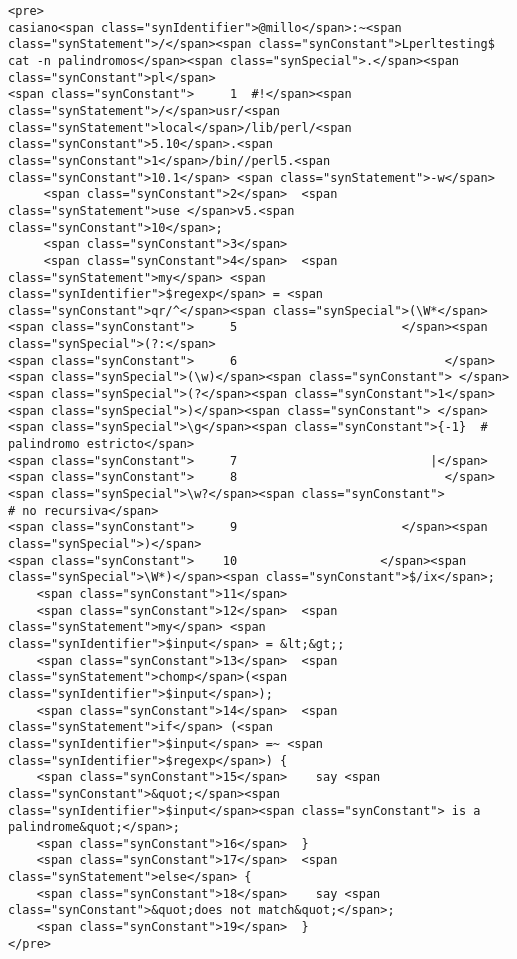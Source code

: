 \begin{verbatim}
<pre>
casiano<span class="synIdentifier">@millo</span>:~<span class="synStatement">/</span><span class="synConstant">Lperltesting$ cat -n palindromos</span><span class="synSpecial">.</span><span class="synConstant">pl</span>
<span class="synConstant">     1  #!</span><span class="synStatement">/</span>usr/<span class="synStatement">local</span>/lib/perl/<span class="synConstant">5.10</span>.<span class="synConstant">1</span>/bin//perl5.<span class="synConstant">10.1</span> <span class="synStatement">-w</span>
     <span class="synConstant">2</span>  <span class="synStatement">use </span>v5.<span class="synConstant">10</span>;
     <span class="synConstant">3</span>
     <span class="synConstant">4</span>  <span class="synStatement">my</span> <span class="synIdentifier">$regexp</span> = <span class="synConstant">qr/^</span><span class="synSpecial">(\W*</span>
<span class="synConstant">     5                       </span><span class="synSpecial">(?:</span>
<span class="synConstant">     6                             </span><span class="synSpecial">(\w)</span><span class="synConstant"> </span><span class="synSpecial">(?</span><span class="synConstant">1</span><span class="synSpecial">)</span><span class="synConstant"> </span><span class="synSpecial">\g</span><span class="synConstant">{-1}  # palindromo estricto</span>
<span class="synConstant">     7                           |</span>
<span class="synConstant">     8                             </span><span class="synSpecial">\w?</span><span class="synConstant">               # no recursiva</span>
<span class="synConstant">     9                       </span><span class="synSpecial">)</span>
<span class="synConstant">    10                    </span><span class="synSpecial">\W*)</span><span class="synConstant">$/ix</span>;
    <span class="synConstant">11</span>
    <span class="synConstant">12</span>  <span class="synStatement">my</span> <span class="synIdentifier">$input</span> = &lt;&gt;;
    <span class="synConstant">13</span>  <span class="synStatement">chomp</span>(<span class="synIdentifier">$input</span>);
    <span class="synConstant">14</span>  <span class="synStatement">if</span> (<span class="synIdentifier">$input</span> =~ <span class="synIdentifier">$regexp</span>) {
    <span class="synConstant">15</span>    say <span class="synConstant">&quot;</span><span class="synIdentifier">$input</span><span class="synConstant"> is a palindrome&quot;</span>;
    <span class="synConstant">16</span>  }
    <span class="synConstant">17</span>  <span class="synStatement">else</span> {
    <span class="synConstant">18</span>    say <span class="synConstant">&quot;does not match&quot;</span>;
    <span class="synConstant">19</span>  }
</pre>

\end{verbatim}


